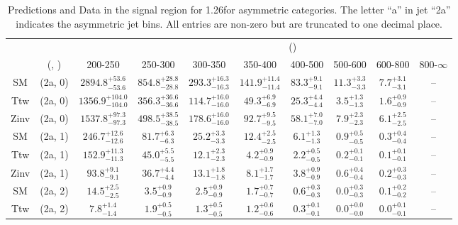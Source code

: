 \begin{table}[h!]
\tiny
\centering
\caption{Predictions and Data in the signal region for 1.26\ifb for asymmetric categories. The letter ``a'' in jet \eg ``2a''  indicates the asymmetric jet bins. All entries are non-zero but are truncated to one decimal place.\label{tab:yieldsnodatapost_sig_comb_asym}}
\begin{tabular}
{cccccccccc}
	\hline\hline
&	&	& \multicolumn{8}{c}{\scalht (\gev)}\\ 
	&	 (\njet, \nb) & 200-250 & 250-300 & 300-350 & 350-400 & 400-500 & 500-600 & 600-800 & 800-$\infty$ \\ [0.8ex] 
\hline
	SM & (2a, 0) & $2894.8^{+ 53.6 }_{- 53.6 }$ & $854.8^{+ 28.8 }_{- 28.8 }$ & $293.3^{+ 16.3 }_{- 16.3 }$ & $141.9^{+ 11.4 }_{- 11.4 }$ & $83.3^{+ 9.1 }_{- 9.1 }$ & $11.3^{+ 3.3 }_{- 3.3 }$ & $7.7^{+ 3.1 }_{- 3.1 }$ & -- \\[0.5ex] 
	Ttw & (2a, 0) & $1356.9^{+ 104.0 }_{- 104.0 }$ & $356.3^{+ 36.6 }_{- 36.6 }$ & $114.7^{+ 16.0 }_{- 16.0 }$ & $49.3^{+ 6.9 }_{- 6.9 }$ & $25.3^{+ 4.4 }_{- 4.4 }$ & $3.5^{+ 1.3 }_{- 1.3 }$ & $1.6^{+ 0.9 }_{- 0.9 }$ & -- \\[0.5ex] 
	Zinv & (2a, 0) & $1537.8^{+ 97.3 }_{- 97.3 }$ & $498.5^{+ 38.5 }_{- 38.5 }$ & $178.6^{+ 16.0 }_{- 16.0 }$ & $92.7^{+ 9.5 }_{- 9.5 }$ & $58.1^{+ 7.0 }_{- 7.0 }$ & $7.9^{+ 2.3 }_{- 2.3 }$ & $6.1^{+ 2.5 }_{- 2.5 }$ & -- \\[0.5ex] 
	SM & (2a, 1) & $246.7^{+ 12.6 }_{- 12.6 }$ & $81.7^{+ 6.3 }_{- 6.3 }$ & $25.2^{+ 3.3 }_{- 3.3 }$ & $12.4^{+ 2.5 }_{- 2.5 }$ & $6.1^{+ 1.3 }_{- 1.3 }$ & $0.9^{+ 0.5 }_{- 0.5 }$ & $0.3^{+ 0.4 }_{- 0.4 }$ & -- \\[0.5ex] 
	Ttw & (2a, 1) & $152.9^{+ 11.3 }_{- 11.3 }$ & $45.0^{+ 5.5 }_{- 5.5 }$ & $12.1^{+ 2.3 }_{- 2.3 }$ & $4.2^{+ 0.9 }_{- 0.9 }$ & $2.2^{+ 0.5 }_{- 0.5 }$ & $0.2^{+ 0.1 }_{- 0.1 }$ & $0.1^{+ 0.1 }_{- 0.1 }$ & -- \\[0.5ex] 
	Zinv & (2a, 1) & $93.8^{+ 9.1 }_{- 9.1 }$ & $36.7^{+ 4.4 }_{- 4.4 }$ & $13.1^{+ 1.8 }_{- 1.8 }$ & $8.1^{+ 1.7 }_{- 1.7 }$ & $3.8^{+ 0.9 }_{- 0.9 }$ & $0.6^{+ 0.4 }_{- 0.4 }$ & $0.2^{+ 0.3 }_{- 0.3 }$ & -- \\[0.5ex] 
	SM & (2a, 2) & $14.5^{+ 2.5 }_{- 2.5 }$ & $3.5^{+ 0.9 }_{- 0.9 }$ & $2.5^{+ 0.9 }_{- 0.9 }$ & $1.7^{+ 0.7 }_{- 0.7 }$ & $0.6^{+ 0.3 }_{- 0.3 }$ & $0.0^{+ 0.3 }_{- 0.3 }$ & $0.1^{+ 0.2 }_{- 0.2 }$ & -- \\[0.5ex] 
	Ttw & (2a, 2) & $7.8^{+ 1.4 }_{- 1.4 }$ & $1.9^{+ 0.5 }_{- 0.5 }$ & $1.3^{+ 0.5 }_{- 0.5 }$ & $1.2^{+ 0.6 }_{- 0.6 }$ & $0.3^{+ 0.1 }_{- 0.1 }$ & $0.0^{+ 0.0 }_{- 0.0 }$ & $0.0^{+ 0.1 }_{- 0.1 }$ & -- \\[0.5ex] 

\end{tabular}
\end{table}
